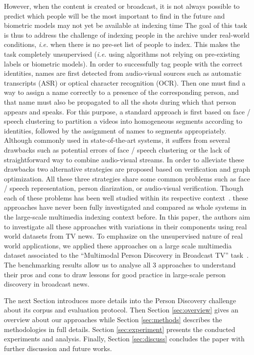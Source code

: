However, when the content is created or broadcast, it is not always possible to predict which people will be the most important to find in the future and biometric models may not yet be available at indexing time The goal of this task is thus to address the challenge of indexing people in the archive under real-world conditions, \emph{i.e.} when there is no pre-set list of people to index.
%
This makes the task completely unsupervised (\emph{i.e.} using algorithms not relying on pre-existing labels or biometric models).
%
In order to successfully tag people with the correct identities, names are first detected from audio-visual sources such as automatic transcripts (ASR) or optical character recognition (OCR). Then one must find a way to assign a name correctly to a presence of the corresponding person, and that name must also be propagated to all the shots during which that person appears and speaks. 
%
For this purpose, a standard approach is first based on face / speech clustering to partition a videos into homogeneous segments according to identities, followed by the assignment of names to segments appropriately.
%
Although commonly used in state-of-the-art systems\cite{nam2015, gravier2015, 1 more from repere}, it suffers from several drawbacks such as potential errors of face / speech clustering or the lack of straightforward way to combine audio-visual streams.
%
In order to alleviate these drawbacks %
two alternative strategies are proposed based on verification and graph optimization. 
%
All these three strategies share some common problems such as face / speech representation, person diarization, or audio-visual verification. Though each of these problems has been well studied within its respective context~\cite{recog,veri,rep}. 
%
these approaches have never been fully investigated and compared as whole systems in the large-scale multimedia indexing context before. In this paper, the authors aim to investigate all these approaches with variations in their components using real world datasets from TV news. 
%
To emphasize on the unsupervised nature of real world applications, we applied these approaches on a large scale multimedia dataset associated to the ``Multimodal Person Discovery in Broadcast TV'' task~\cite{POIGNANT--MEDIAEVAL--2015,bredin2016mediaeval}.
%
The benchmarking results allow us to analyse all 3 approaches to understand their pros and cons to draw lessons for good practice in large-scale person discovery in broadcast news.

The next Section introduces more details into the Person Discovery challenge about its corpus and evaluation protocol.
Then Section \ref{sec:overview} gives an overview about our approaches while Section \ref{sec:methods} describes the methodologies in full details.
Section \ref{sec:experiment} presents the conducted experiments and analysis.
%
Finally, Section \ref{sec:discuss} concludes the paper 
with further discussion and future works.

\endinput
